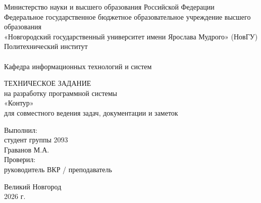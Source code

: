 \begin{titlepage}
\begin{center}

Министерство науки и высшего образования Российской Федерации
\\
Федеральное государственное бюджетное образовательное учреждение 
высшего образования
\\
«Новгородский государственный университет имени Ярослава Мудрого» (НовГУ)
\\
Политехнический институт
\\
\tiny\underline{\hspace{16cm}}
\\
\normalsize \lsstyle Кафедра информационных технологий и систем
\\
\end{center}

\vspace*{25mm}

\begin{center}
ТЕХНИЧЕСКОЕ ЗАДАНИЕ
\\
на разработку программной системы
\\
«Контур»
\\
для совместного ведения задач, документации и заметок
\\
\end{center}

\vspace*{20mm}

\begin{flushright}
\begin{minipage}[t]{0.52\textwidth}
Выполнил:
\\
студент группы 2093
\\
Граванов М.А.
\\
Проверил:
\\
руководитель ВКР / преподаватель
\\
\underline{\hspace{55mm}}
\end{minipage}
\end{flushright}

\vfill

\begin{center}
Великий Новгород
\\
2026 г.
\end{center}
\end{titlepage}
\restoregeometry
\addtocounter{page}{1}
